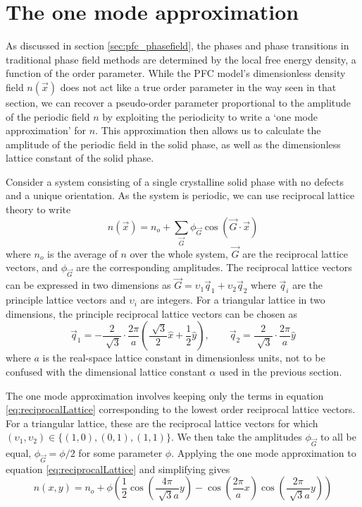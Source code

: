 \section{The one mode approximation}\label{sec:pfc_1mode}

As discussed in section \ref{sec:pfc_phasefield}, the phases and phase transitions in traditional phase field methods are determined by the local free energy density, a function of the order parameter. While the PFC model's dimensionless density field $n(\vec{x})$ does not act like a true order parameter in the way seen in that section, we can recover a pseudo-order parameter proportional to the amplitude of the periodic field $n$ by exploiting the periodicity to write a `one mode approximation' for $n$. This approximation then allows us to calculate the amplitude of the periodic field in the solid phase, as well as the dimensionless lattice constant of the solid phase.

Consider a system consisting of a single crystalline solid phase with no defects and a unique orientation. As the system is periodic, we can use reciprocal lattice theory to write
\begin{equation}\label{eq:reciprocalLattice}
n(\vec{x}) = n_o + \sum_{\vec{G}} \phi_{\vec{G}} \cos(\vec{G} \cdot \vec{x})
\end{equation}
where $n_o$ is the average of $n$ over the whole system, $\vec{G}$ are the reciprocal lattice vectors, and $\phi_{\vec{G}}$ are the corresponding amplitudes. The reciprocal lattice vectors can be expressed in two dimensions as $\vec{G}=\upsilon_1 \vec{q}_1+\upsilon_2 \vec{q}_2$ where $\vec{q}_i$ are the principle lattice vectors and $\upsilon_i$ are integers. For a triangular lattice in two dimensions, the principle reciprocal lattice vectors can be chosen as
\begin{equation}\label{eq:principalRecVec}
\vec{q}_1 = -\frac{2}{\sqrt[]{3}}\cdot\frac{2\pi}{a}\left(\frac{\sqrt[]{3}}{2}\hat{x}+\frac{1}{2}\hat{y}\right), \qquad \vec{q}_2 = \frac{2}{\sqrt[]{3}}\cdot\frac{2\pi}{a}\hat{y}
\end{equation}
where $a$ is the real-space lattice constant in dimensionless units, not to be confused with the dimensional lattice constant $\alpha$ used in the previous section.

The one mode approximation involves keeping only the terms in equation \ref{eq:reciprocalLattice} corresponding to the lowest order reciprocal lattice vectors. For a triangular lattice, these are the reciprocal lattice vectors for which $(\upsilon_1,\upsilon_2)\in \{(1,0),(0,1),(1,1)\}$. We then take the amplitudes $\phi_{\vec{G}}$ to all be equal, $\phi_{\vec{G}}=\phi/2$ for some parameter $\phi$. Applying the one mode approximation to equation \ref{eq:reciprocalLattice} and simplifying gives
\begin{equation}\label{eq:oneMode}
n(x,y) = n_o + \phi\left(\frac{1}{2}\cos\left(\frac{4\pi}{\sqrt[]{3} a}y\right) - \cos\left(\frac{2\pi}{a}x\right)\cos\left(\frac{2\pi}{\sqrt[]{3} a}y\right) \right)
\end{equation}

